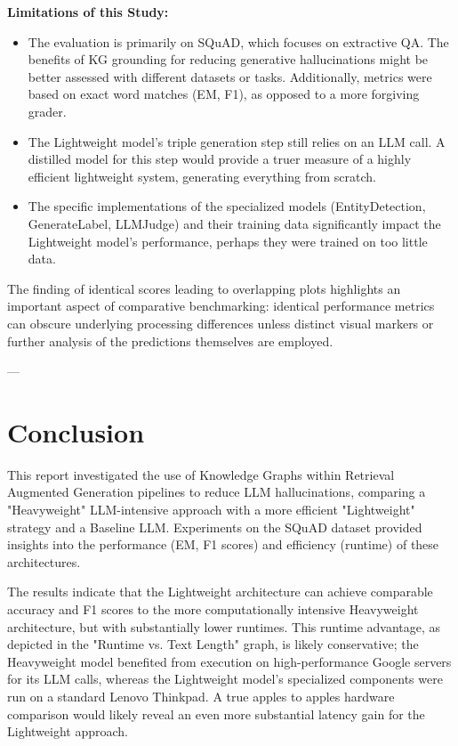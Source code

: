 \documentclass{article}
\begin{document}
\textbf{Limitations of this Study:}
\begin{itemize}[noitemsep,topsep=0pt]
\item The evaluation is primarily on SQuAD, which focuses on extractive QA. The benefits of KG grounding for reducing generative hallucinations might be better assessed with different datasets or tasks. Additionally, metrics were based on exact word matches (EM, F1), as opposed to a more forgiving grader.
\item The Lightweight model's triple generation step still relies on an LLM call. A distilled model for this step would provide a truer measure of a highly efficient lightweight system, generating everything from scratch.
\item The specific implementations of the specialized models (EntityDetection, GenerateLabel, LLMJudge) and their training data significantly impact the Lightweight model's performance, perhaps they were trained on too little data.
\end{itemize}

The finding of identical scores leading to overlapping plots highlights an important aspect of comparative benchmarking: identical performance metrics can obscure underlying processing differences unless distinct visual markers or further analysis of the predictions themselves are employed.

---
\section{Conclusion}
\label{sec:conclusion}
This report investigated the use of Knowledge Graphs within Retrieval Augmented Generation pipelines to reduce LLM hallucinations, comparing a "Heavyweight" LLM-intensive approach with a more efficient "Lightweight" strategy and a Baseline LLM. Experiments on the SQuAD dataset provided insights into the performance (EM, F1 scores) and efficiency (runtime) of these architectures.

The results indicate that the Lightweight architecture can achieve comparable accuracy and F1 scores to the more computationally intensive Heavyweight architecture, but with substantially lower runtimes. This runtime advantage, as depicted in the "Runtime vs. Text Length" graph, is likely conservative; the Heavyweight model benefited from execution on high-performance Google servers for its LLM calls, whereas the Lightweight model's specialized components were run on a standard Lenovo Thinkpad. A true apples to apples hardware comparison would likely reveal an even more substantial latency gain for the Lightweight approach.
\end{document}
